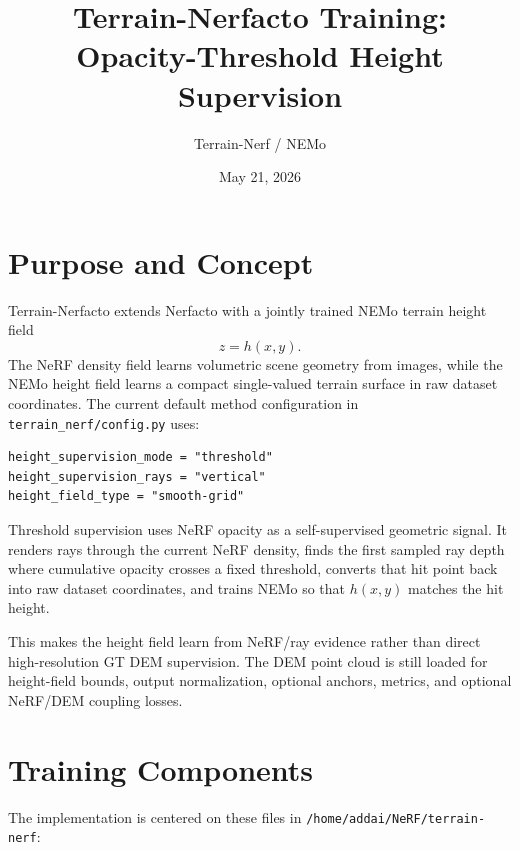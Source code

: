 \documentclass[11pt]{article}
\title{Terrain-Nerfacto Training: Opacity-Threshold Height Supervision}
\author{Terrain-Nerf / NEMo}
\date{May 21, 2026}
\begin{document}
\setlength{\emergencystretch}{3em}
\maketitle

\section{Purpose and Concept}

Terrain-Nerfacto extends Nerfacto with a jointly trained NEMo terrain height field
\[
  z = h(x,y).
\]
The NeRF density field learns volumetric scene geometry from images, while the NEMo height field learns a compact single-valued terrain surface in raw dataset coordinates. The current default method configuration in \texttt{terrain\_nerf/config.py} uses:

\begin{lstlisting}
height_supervision_mode = "threshold"
height_supervision_rays = "vertical"
height_field_type = "smooth-grid"
\end{lstlisting}

Threshold supervision uses NeRF opacity as a self-supervised geometric signal. It renders rays through the current NeRF density, finds the first sampled ray depth where cumulative opacity crosses a fixed threshold, converts that hit point back into raw dataset coordinates, and trains NEMo so that \(h(x,y)\) matches the hit height.

This makes the height field learn from NeRF/ray evidence rather than direct high-resolution GT DEM supervision. The DEM point cloud is still loaded for height-field bounds, output normalization, optional anchors, metrics, and optional NeRF/DEM coupling losses.

\section{Training Components}

The implementation is centered on these files in \texttt{/home/addai/NeRF/terrain-nerf}:
\end{document}
